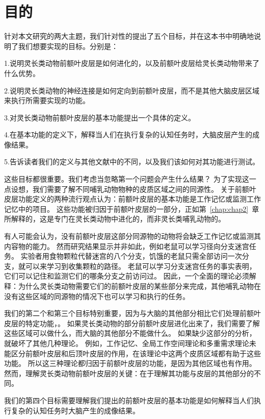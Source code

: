 \section{目的}
针对本文研究的两大主题，我们针对性的提出了五个目标，并在这本书中明确地说明了我们想要实现的目标。分别是：
\par 
  1.说明灵长类动物前额叶皮层是如何进化的，以及前额叶皮层给灵长类动物带来了什么优势。 
\par 2.说明灵长类动物的神经连接是如何定向到前额叶皮层，而不是其他大脑皮层区域来执行所需要实现的功能。 
\par 3.对灵长类动物前额叶皮层的基本功能提出一个具体的定义。
\par 4.在基本功能的定义下，解释当人们在执行复杂的认知任务时，大脑皮层产生的成像结果。
\par  5.告诉读者我们的定义与其他文献中的不同，以及我们该如何对其功能进行测试。
\par 
这些目标都很重要。我们考虑当忽略第一个问题会产生什么结果？
为了实现这一点设想，我们需要了解不同哺乳动物物种的皮质区域之间的同源性。
关于前额叶皮层功能定义的两种流行观点认为：前额叶皮层的基本功能是工作记忆\cite{goldman1996prefrontal}或监测工作记忆中的项目\cite{petrides1996specialized}。
这些功能被归因于前额叶皮层的一部分，正如第~\ref{chap:chap2}~章所解释的，这是专门在灵长类动物中进化的，而非灵长类哺乳动物的。
\par 
有人可能会认为，没有前额叶皮层这部分同源物的动物将会缺乏工作记忆或监测其内容物的能力。
然而研究结果显示并非如此，例如老鼠可以学习径向分支迷宫任务。
实验者用食物颗粒代替迷宫的八个分支，饥饿的老鼠只需全部访问一次分支，就可以来学习到收集颗粒的路径\cite{olton1982disconnection}。
老鼠可以学习分支迷宫任务的事实表明，它们可以记住和监测它们的哪条分支之前访问过。
因此，一个全面的理论必须解释：为什么灵长类动物需要它们的前额叶皮层的某些部分来完成，其他哺乳动物在没有这些区域的同源物的情况下也可以学习和执行的任务。
\par
我们的第二个和第三个目标特别重要，因为与大脑的其他部分相比它们处理前额叶皮层的特定功能，。
如果灵长类动物的部分前额叶皮层进化出来了，我们需要了解这些区域可以做什么，而大脑的其他部分不能做什么。
如果缺少这部分的分析，就破坏了其他几种理论。
例如，工作记忆\cite{baddeley1998domain}、全局工作空间理论\cite{dehaene1998neuronal}和多重需求理论未能区分前额叶皮层和后顶叶皮层的作用，在该理论中这两个皮质区域都有助于这些功能。
所以这三种理论都归因于前额叶皮层的功能，是因为其他区域也有作用。
然而，理解灵长类动物前额叶皮层的关键：在于理解其功能与皮层的其他部分的不同。
\par
我们的第四个目标需要理解我们提出的前额叶皮层的基本功能是如何解释当人们执行复杂的认知任务时大脑产生的成像结果。
